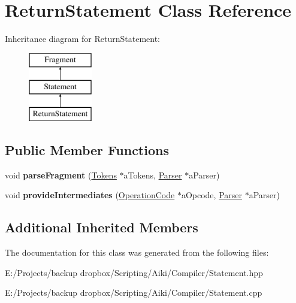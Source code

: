 \hypertarget{a00020}{\section{Return\+Statement Class Reference}
\label{a00020}
}
Inheritance diagram for Return\+Statement\+:\begin{figure}[H]
\begin{center}
\leavevmode
\includegraphics[height=3.000000cm]{db/db2/a00020}
\end{center}
\end{figure}
\subsection*{Public Member Functions}
\begin{DoxyCompactItemize}
\item 
\hypertarget{a00020_a014a69058c260757d442b020db684223}{void {\bfseries parse\+Fragment} (\hyperlink{a00026}{Tokens} $\ast$a\+Tokens, \hyperlink{a00017}{Parser} $\ast$a\+Parser)}\label{a00020_a014a69058c260757d442b020db684223}

\item 
\hypertarget{a00020_a1ef2a1cdad6862bc5d9d18503bc65981}{void {\bfseries provide\+Intermediates} (\hyperlink{a00015}{Operation\+Code} $\ast$a\+Opcode, \hyperlink{a00017}{Parser} $\ast$a\+Parser)}\label{a00020_a1ef2a1cdad6862bc5d9d18503bc65981}

\end{DoxyCompactItemize}
\subsection*{Additional Inherited Members}


The documentation for this class was generated from the following files\+:\begin{DoxyCompactItemize}
\item 
E\+:/\+Projects/backup dropbox/\+Scripting/\+Aiki/\+Compiler/Statement.\+hpp\item 
E\+:/\+Projects/backup dropbox/\+Scripting/\+Aiki/\+Compiler/Statement.\+cpp\end{DoxyCompactItemize}
